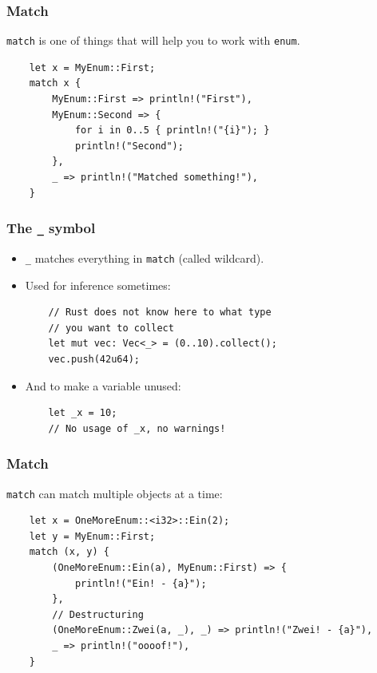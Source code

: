\documentclass[aspectratio=1610,t]{beamer}
\begin{document}

\begin{frame}[fragile]
\frametitle{Match}
\texttt{match} is one of things that will help you to work with \texttt{enum}.

\begin{verbatim}
    let x = MyEnum::First;
    match x {
        MyEnum::First => println!("First"),
        MyEnum::Second => {
            for i in 0..5 { println!("{i}"); }
            println!("Second");
        },
        _ => println!("Matched something!"),
    }
\end{verbatim}
\end{frame}


\begin{frame}[fragile]
\frametitle{The \texttt{\_} symbol}
\begin{itemize}
    \item \texttt{\_} matches everything in \texttt{match} (called wildcard).
    \item Used for inference sometimes:
    \begin{verbatim}
    // Rust does not know here to what type
    // you want to collect
    let mut vec: Vec<_> = (0..10).collect();
    vec.push(42u64);
    \end{verbatim}
    \item And to make a variable unused:
    \begin{verbatim}
    let _x = 10;
    // No usage of _x, no warnings!
    \end{verbatim}
\end{itemize}
\end{frame}


\begin{frame}[fragile]
\frametitle{Match}
\texttt{match} can match multiple objects at a time:

\begin{verbatim}
    let x = OneMoreEnum::<i32>::Ein(2);
    let y = MyEnum::First;
    match (x, y) {
        (OneMoreEnum::Ein(a), MyEnum::First) => {
            println!("Ein! - {a}");
        },
        // Destructuring
        (OneMoreEnum::Zwei(a, _), _) => println!("Zwei! - {a}"),
        _ => println!("oooof!"),
    }
\end{verbatim}
\end{frame}
\end{document}
